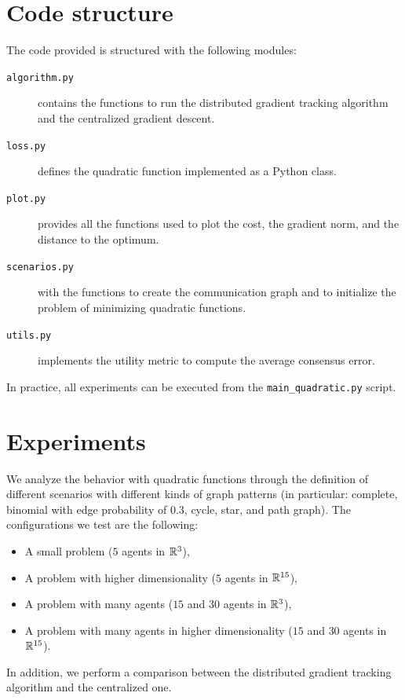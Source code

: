 \documentclass[a4paper,11pt,oneside]{book}
\begin{document}
\section{Code structure} \label{sec:code_quadratic}
The code provided is structured with the following modules:
\begin{description}
      \item[\texttt{algorithm.py}] contains the functions to run the distributed gradient tracking algorithm and the centralized gradient descent.
      \item[\texttt{loss.py}] defines the quadratic function implemented as a Python class.
      \item[\texttt{plot.py}] provides all the functions used to plot the cost, the gradient norm, and the distance to the optimum.
      \item[\texttt{scenarios.py}] with the functions to create the communication graph and to initialize the problem of minimizing quadratic functions.
      \item[\texttt{utils.py}] implements the utility metric to compute the average consensus error.
\end{description}
In practice, all experiments can be executed from the \texttt{main\_quadratic.py} script.



\section{Experiments}

We analyze the behavior with quadratic functions through the definition of different scenarios with different kinds of graph patterns (in particular: complete, binomial with edge probability of $0.3$, cycle, star, and path graph). The configurations we test are the following:
\begin{itemize}
      \item A small problem ($5$ agents in ${\mathbb{R}}^3$),
      \item A problem with higher dimensionality ($5$ agents in ${\mathbb{R}}^{15}$),
      \item A problem with many agents ($15$ and $30$ agents in ${\mathbb{R}}^3$),
      \item A problem with many agents in higher dimensionality ($15$ and $30$ agents in ${\mathbb{R}}^{15}$).
\end{itemize}
In addition, we perform a comparison between the distributed gradient tracking algorithm and the centralized one. 
\end{document}
